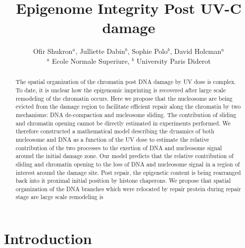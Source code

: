 \documentclass[12pt]{article}
\begin{document}
	
	\title{Epigenome Integrity Post UV-C damage}
	\author{Ofir Shukron$^a$, Julliette Dabin$^b$, Sophie Polo$^b$, David Holcman$^a$\\
		\small{$^a$ Ecole Normale Superiure, $^b$ University Paris Diderot}}	
	\maketitle
	
\begin{abstract}
   The spatial 	organization of the chromatin post DNA damage by UV dose is complex. To date, it is unclear how the epigenomic imprinting is recovered after large scale remodeling of the chromatin occurs. Here we propose that the nucleosome are being evicted from the damage region to facilitate efficient repair along the chromatin by two mechanisms: DNA de-compaction and nucleosome sliding. The contribution of sliding and chromatin opening cannot be directly estimated in experiments performed. We therefore constructed a mathematical model describing the dynamics of both nucleosome and DNA as a function of the UV dose to estimate the relative contribution of the two processes to the exertion of DNA and nucleosome signal around the initial damage zone. Our model predicts that the relative contribution of sliding and chromatin opening to the loss of DNA and nucleosome signal in a region of interest around the damage site. Post repair, the epigenetic content is being rearranged back into it proximal initial position by histone chaperons. We propose that spatial organization of the DNA branches which were relocated by repair protein during repair stage are large scale remodeling is 
\end{abstract}

\section{Introduction}\label{section:Introduction}
	 
	 
	 
	 
	 
	 
\end{document}
